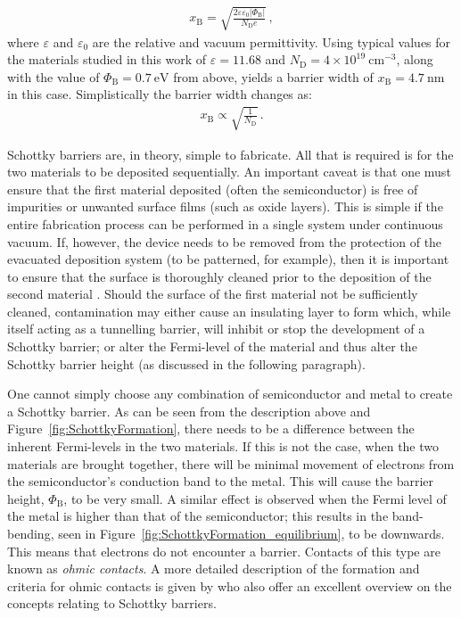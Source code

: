 \begin{align}
x_{\mathrm{B}} = 	
	\sqrt{\frac{2\varepsilon\varepsilon_{0}\left|\varPhi_{\mathrm{B}}\right|}
	{N_{\mathrm{D}}e}}\,, \label{eqn:barrierWidth}
\end{align}
where $\varepsilon$ and $\varepsilon_{0}$ are the relative and vacuum permittivity. Using typical values for the materials studied in this work of $\varepsilon = 11.68$ and $N_{\mathrm{D}} = 4 \times 10^{19}~\mathrm{cm^{-3}}$, along with the value of $\varPhi_{\mathrm{B}} = 0.7~\mathrm{eV}$ from above, yields a barrier width of $x_{\mathrm{B}} = 4.7~\mathrm{nm}$ in this case. Simplistically the barrier width changes as:
\begin{align}
x_{\mathrm{B}} \propto \sqrt{\frac{1}{N_{\mathrm{D}}}}\,. 
\label{eqn:barrierWdithApprox} 
\end{align}
\par  
Schottky barriers are, in theory, simple to fabricate. All that is required is for the two materials to be deposited sequentially. An important caveat is that one must ensure that the first material deposited (often the semiconductor) is free of impurities or unwanted surface films (such as oxide layers). This is simple if the entire fabrication process can be performed in a single system under continuous vacuum. If, however, the device needs to be removed from the protection of the evacuated deposition system (to be patterned, for example), then it is important to ensure that the surface is thoroughly cleaned prior to the deposition of the second material \parencite[a good description of surface preparation requirements is given by][]{Roccaforte2003}. Should the surface of the first material not be sufficiently cleaned, contamination may either cause an insulating layer to form which, while itself acting as a tunnelling barrier, will inhibit or stop the development of a Schottky barrier; or alter the Fermi-level of the material and thus alter the Schottky barrier height (as discussed in the following paragraph).
\par 
One cannot simply choose any combination of semiconductor and metal to create a Schottky barrier. As can be seen from the description above and Figure~\ref{fig:SchottkyFormation}, there needs to be a difference between the inherent Fermi-levels in the two materials. If this is not the case, when the two materials are brought together, there will be minimal movement of electrons from the semiconductor's conduction band to the metal. This will cause the barrier height, $\varPhi_{\mathrm{B}}$, to be very small. A similar effect is observed when the Fermi level of the metal is higher than that of the semiconductor; this results in the band-bending, seen in Figure~\ref{fig:SchottkyFormation_equilibrium}, to be downwards. This means that electrons do not encounter a barrier. Contacts of this type are known as \textit{ohmic contacts}. A more detailed description of the formation and criteria for ohmic contacts is given by \textcite{Rhoderick1988} who also offer an excellent overview on the concepts relating to Schottky barriers.

